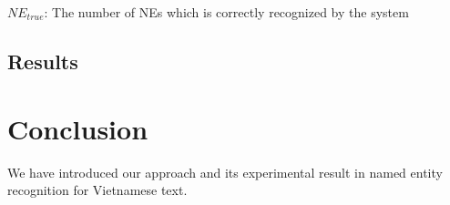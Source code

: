 \documentclass[11pt,a4paper]{article}
\begin{document}
$NE_{true}$: The number of NEs which is correctly recognized by the system

\subsection{Results}


\section{Conclusion}

We have introduced our approach and its experimental result in named entity recognition for Vietnamese text.




\end{document}
